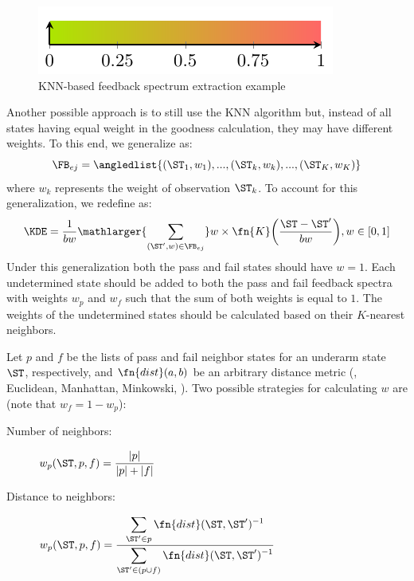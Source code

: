 \begin{figure}[!ht]
  \includegraphics[page=6]{figures/conclusions/figures/main.pdf}
  \caption{\acs{KNN}-based feedback spectrum extraction example}
  \label{fig:conclusions:knn}
\end{figure}

Another possible approach is to still use the \ac{KNN} algorithm but,
instead of all states having equal weight in the goodness calculation,
they may have different weights.
%
To this end, we generalize  as:
\begin{equation}
  \label{eq:conclusions:feedback-spectrum}
  \FB_{ej} = \angledlist{(\ST_1, w_1), ...,  (\ST_k, w_k), ..., (\ST_K,w_K)}
\end{equation}
\noindent
where $w_k$ represents the weight of observation $\ST_k$.
%
To account for this generalization, we redefine
 as:
\begin{equation}
  \KDE = \frac {1}{bw}{\mathlarger{\sum_{(\ST^\prime, w) \in \FB_{ej}}} w\times\fn{K}\bigg(\frac{\ST - \ST^\prime}{bw}\bigg)}, w \in [0,1]
\end{equation}
%
Under this generalization both the pass and fail states should have
$w = 1$.
%
Each undetermined state should be added to both the pass and fail
feedback spectra with weights $w_p$ and $w_f$ such that the sum of
both weights is equal to $1$.
%
The weights of the undetermined states should be calculated based on
their $K$-nearest neighbors.

Let $p$ and $f$ be the lists of pass and fail neighbor states for an
underarm state $\ST$, respectively, and $\fn{dist}(a,b)$ be an
arbitrary distance metric (\eg, Euclidean, Manhattan, Minkowski,
\etc).
%
Two possible strategies for calculating $w$ are (note that
$w_f = 1 - w_p$):
\begin{description}
\item[Number of neighbors:] $\displaystyle w_{p}(\ST,p,f) = \frac{|p|}{|p|+|f|}$
\item[Distance to neighbors:]
  $\displaystyle w_p(\ST,p,f) = \frac{\displaystyle\sum_{\ST^\prime \in p} \fn{dist}(\ST,
    \ST^\prime)^{-1}}{\displaystyle\sum_{\ST^\prime \in (p \cup f)} \fn{dist}(\ST, \ST^\prime)^{-1}}$
\end{description}

